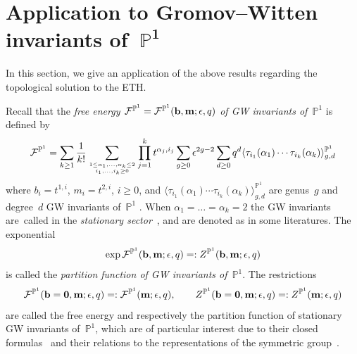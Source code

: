 \documentclass[pdftex]{sigma}
\newcommand{\e}{\epsilon}
\newcommand{\bP}{\mathbb{P}}
\numberwithin{equation}{section}
\begin{document}
\section[Application to Gromov--Witten invariants of P\string^{}1]{Application to Gromov--Witten invariants of~$\boldsymbol{\mathbb{P}^1}$} \label{sectionP1}
In this section, we give an application of the above results regarding the topological solution to the ETH.

Recall that the {\it free energy $\mathcal{F}^{\bP^1}=\mathcal{F}^{\bP^1}({\bf b}, {\bf m};\e,q)$ of GW invariants of~$\bP^1$} is defined by
\begin{gather*}%
\mathcal{F}^{\bP^1} = \sum_{k\geq 1} \frac1{k!}
\sum_{1\leq \alpha_1,\dots,\alpha_k\leq 2 \atop i_1,\dots,i_k\geq 0} \prod_{j=1}^k t^{\alpha_j,i_j} \sum_{g\ge0} \e^{2g-2} \sum_{d\ge0} q^d
\langle \tau_{i_1} (\alpha_1) \cdots \tau_{i_k} (\alpha_k) \rangle^{\bP^1}_{g,d}
\end{gather*}
where %
$b_i=t^{1,i}$, $m_i=t^{2,i}$, $i\ge0$,
and $\langle \tau_{i_1} (\alpha_1) \cdots \tau_{i_k} (\alpha_k) \rangle^{\bP^1}_{g,d}$ are
genus~$g$ and degree~$d$ GW invariants of~$\bP^1$ %
\cite{DYZ, DZ-toda, OP2, OP1}.
When $\alpha_1=\dots=\alpha_k=2$ the GW invariants \smash{$\langle \tau_{i_1} (\alpha_1) \cdots \tau_{i_k} (\alpha_k) \rangle^{\bP^1}_{g,d}$}
are~called in the {\it stationary sector}~\cite{OP2, OP1}, and are denoted as
\smash{$\langle \prod_{j=1}^n \tau_{i_j} (H) \rangle^{\bP^1}_{g,d}$} in some literatures.
The exponential
\[
\exp \mathcal{F}^{\bP^1}({\bf b}, {\bf m};\e,q) =: Z^{\bP^1}({\bf b}, {\bf m};\e,q)
\]
is called the {\it partition function of GW invariants of~$\bP^1$}. The restrictions
\[
\mathcal{F}^{\bP^1}({\bf b}={\bf 0}, {\bf m};\e,q)
=: \mathcal{F}^{\bP^1}({\bf m};\e,q), \qquad Z^{\bP^1}({\bf b}={\bf 0}, {\bf m};\e,q) =:
Z^{\bP^1}({\bf m};\e,q)
\]
are called the free energy and respectively the partition function of stationary GW invariants of~$\bP^1$,
which are of particular interest due to their closed formulas~\cite{DYZ} and their relations to
the representations of the symmetric group~\cite{OP1}.
\end{document}
